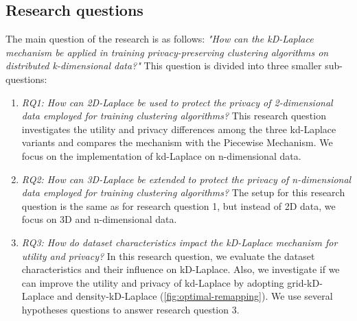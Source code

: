 \subsection{Research questions}
The main question of the research is as follows: \newline \newline
\textit{"How can the kD-Laplace mechanism be applied in training privacy-preserving clustering algorithms on distributed k-dimensional data?"} \newline
This question is divided into three smaller sub-questions:
\begin{enumerate}
      \item \textit{RQ1: How can 2D-Laplace be used to protect the privacy of 2-dimensional data employed for training clustering algorithms?} \newline
            This research question investigates the utility and privacy differences among the three kd-Laplace variants and compares the mechanism with the Piecewise Mechanism.
            We focus on the implementation of kd-Laplace on n-dimensional data.
      \item \textit{RQ2: How can 3D-Laplace be extended to protect the privacy of n-dimensional data employed for training clustering algorithms?} \newline
            The setup for this research question is the same as for research question 1, but instead of 2D data, we focus on 3D and n-dimensional data.
      \item \textit{RQ3: How do dataset characteristics impact the kD-Laplace mechanism for utility and privacy?} \newline
            In this research question, we evaluate the dataset characteristics and their influence on kD-Laplace.
            Also, we investigate if we can improve the utility and privacy of kd-Laplace by adopting grid-kD-Laplace and density-kD-Laplace (\ref{fig:optimal-remapping}).
            We use several hypotheses questions to answer research question 3.


\end{enumerate}
